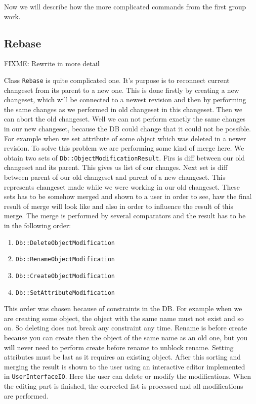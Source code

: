 \documentclass[deska]{subfiles}
\begin{document}
Now we will describe how the more complicated commands from the first group work.

\subsection{Rebase}

FIXME: Rewrite in more detail

Class {\tt Rebase} is quite complicated one. It's purpose is to reconnect current changeset from its parent to a new
one. This is done firstly by creating a new changeset, which will be connected to a newest revision and then by performing
the same changes as we performed in old changeset in this changeset. Then we can abort the old changeset. Well we can not
perform exactly the same changes in our new changeset, because the DB could change that it could not be possible. For
example when we set attribute of some object which was deleted in a newer revision. To solve this problem we are performing
some kind of merge here. We obtain two sets of {\tt Db::ObjectModificationResult}. Firs is diff between our old changeset
and its parent. This gives us list of our changes. Next set is diff between parent of our old changeset and parent of a
new changeset. This represents changeset made while we were working in our old changeset. These sets has to be somehow
merged and shown to a user in order to see, haw the final result of merge will look like and also in order to influence
the result of this merge. The merge is performed by several comparators and the result has to be in the following order:
\begin{enumerate}
    \item {\tt Db::DeleteObjectModification}
    \item {\tt Db::RenameObjectModification}
    \item {\tt Db::CreateObjectModification}
    \item {\tt Db::SetAttributeModification}
\end{enumerate}
This order was chosen because of constraints in the DB. For example when we are creating some object, the object with
the same name must not exist and so on. So deleting does not break any constraint any time. Rename is before create
because you can create then the object of the same name as an old one, but you will never need to perform create before
rename to unblock rename. Setting attributes must be last as it requires an existing object. After this sorting and
merging the result is shown to the user using an interactive editor implemented in {\tt UserInterfaceIO}. Here the user
can delete or modify the modifications. When the editing part is finished, the corrected list is processed and
all modifications are performed.
\end{document}
